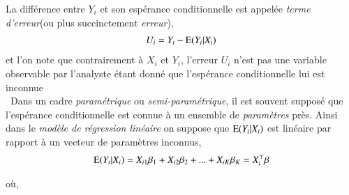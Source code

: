 \documentclass[10pt, reqno]{amsart}
\begin{document}
La différence entre $Y_i$ et son espérance conditionnelle est appelée \emph{terme d'erreur}(ou plus succinctement \emph{erreur}),
\begin{align}
U_i = Y_i - \operatorname{E}(Y_i| X_i)
\label{eq1}
\end{align} 
 et l'on note que contrairement à $X_i$ et $Y_i$, l'erreur $U_i$ n'est pas une variable observable par l'analyste étant donné que l'espérance conditionnelle lui est inconnue\\\
Dans un cadre \emph{paramétrique} ou \emph{semi-paramétrique}, il est souvent supposé que l'espérance conditionnelle est connue à un ensemble de \emph{paramètres} près. Ainsi dans le \emph{modèle de régression linéaire} on suppose que $\operatorname{E}(Y_i|X_i)$ est linéaire par rapport à un vecteur de paramètres inconnus,
\begin{align}
\operatorname{E}(Y_i|X_i) = X_{i1}\beta_1 +  X_{i2}\beta_2 + ...+ X_{iK}\beta_K = X_i^\top\beta
\label{eq2}
\end{align}

où,
\end{document}
